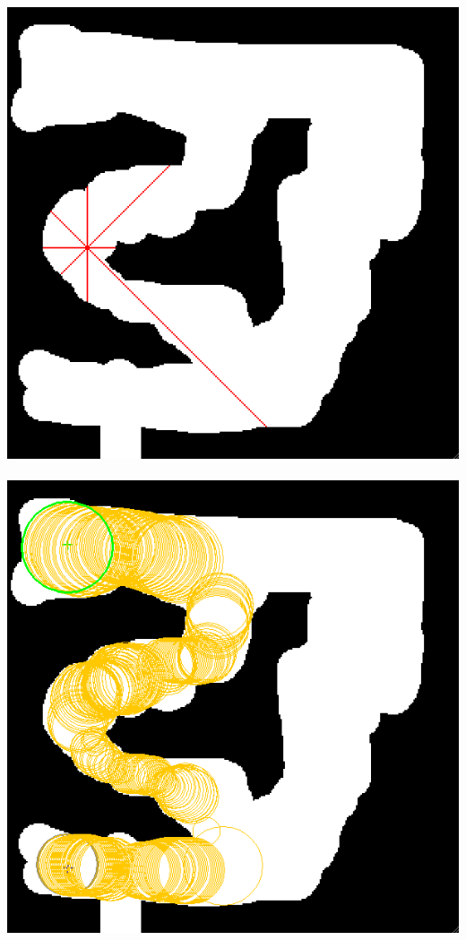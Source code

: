 \documentclass[11pt,a4paper,oneside,onecolumn]{scrartcl}
\begin{document}
	\\
	\includegraphics[scale=0.45]{p3.png} \\ \\
	\includegraphics[scale=0.45]{p4.png} 
\end{document}
